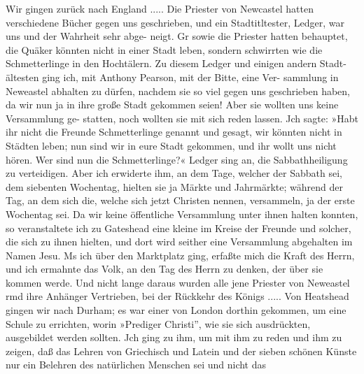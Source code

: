 Wir gingen zurück nach England ..... Die Priester
von Newcastel hatten verschiedene Bücher gegen uns geschrieben,
und ein Stadtitltester, Ledger, war uns und der Wahrheit sehr abge-
neigt. Gr sowie die Priester hatten behauptet, die Quäker könnten
nicht in einer Stadt leben, sondern schwirrten wie die Schmetterlinge
in den Hochtälern. Zu diesem Ledger und einigen andern Stadt-
ältesten ging ich, mit Anthony Pearson, mit der Bitte, eine Ver-
sammlung in Neweastel abhalten zu dürfen, nachdem sie so viel
gegen uns geschrieben haben, da wir nun ja in ihre große Stadt
gekommen seien! Aber sie wollten uns keine Versammlung ge-
statten, noch wollten sie mit sich reden lassen. Jch sagte: »Habt
ihr nicht die Freunde Schmetterlinge genannt und gesagt, wir
könnten nicht in Städten leben; nun sind wir in eure Stadt gekommen,
und ihr wollt uns nicht hören. Wer sind nun die Schmetterlinge?«
Ledger sing an, die Sabbathheiligung zu verteidigen. Aber ich
erwiderte ihm, an dem Tage, welcher der Sabbath sei, dem siebenten
Wochentag, hielten sie ja Märkte und Jahrmärkte; während der Tag,
an dem sich die, welche sich jetzt Christen nennen, versammeln, ja
der erste Wochentag sei. Da wir keine öffentliche Versammlung
unter ihnen halten konnten, so veranstaltete ich zu Gateshead
eine kleine im Kreise der Freunde und solcher, die sich zu ihnen
hielten, und dort wird seither eine Versammlung abgehalten im
Namen Jesu. Ms ich über den Marktplatz ging, erfaßte mich
die Kraft des Herrn, und ich ermahnte das Volk, an den Tag
des Herrn zu denken, der über sie kommen werde. Und nicht
lange daraus wurden alle jene Priester von Neweastel rmd ihre
Anhänger Vertrieben, bei der Rückkehr des Königs ..... Von
Heatshead gingen wir nach Durham; es war einer von London
dorthin gekommen, um eine Schule zu errichten, worin »Prediger
Christi'', wie sie sich ausdrückten, ausgebildet werden sollten. Jch
ging zu ihm, um mit ihm zu reden und ihm zu zeigen, daß das
Lehren von Griechisch und Latein und der sieben schönen Künste
nur ein Belehren des natürlichen Menschen sei und nicht das


